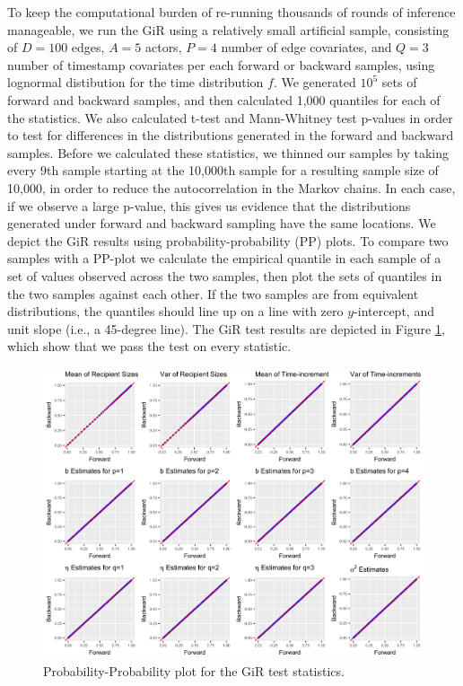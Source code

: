 \documentclass[ba]{imsart}
\numberwithin{equation}{section}
\theoremstyle{plain}
\begin{document}
   To keep the computational burden of re-running thousands of rounds of inference manageable, we run the GiR using a relatively small artificial sample, consisting of $D=100$ edges, $A=5$ actors, $P=4$ number of edge covariates, and $Q=3$ number of timestamp covariates per each forward or backward samples, using lognormal distibution for the time distribution $f$. We generated $10^5$ sets of forward and backward samples, and then calculated 1,000 quantiles for each of the statistics. We also calculated t-test and Mann-Whitney test p-values in order to test for differences in the distributions generated in the forward and backward samples. Before we calculated these statistics, we thinned our samples by taking every 9th sample starting at the 10,000th sample for a resulting sample size of 10,000, in order to reduce the autocorrelation in the Markov chains. In each case, if we observe a large p-value, this gives us evidence that the distributions generated under forward and backward sampling have the same locations. We depict the GiR results using probability-probability (PP) plots. To compare two samples with a PP-plot we calculate the empirical quantile in each sample of a set of values observed across the two samples, then plot the sets of quantiles in the two samples against each other. If the two samples are from equivalent distributions, the quantiles should line up on a line with zero $y$-intercept, and unit slope (i.e., a 45-degree line). The GiR test results are depicted in Figure \ref{figure:GiRplot}, which show that we pass the test on every statistic.
   \begin{figure}[ht]
   	\centering
   	\includegraphics[width=1\textwidth]{img/GiRplot-1.png}	
   	\caption{Probability-Probability plot for the GiR test statistics.}
   	   	\label{figure:GiRplot}
   \end{figure}
\end{document}
